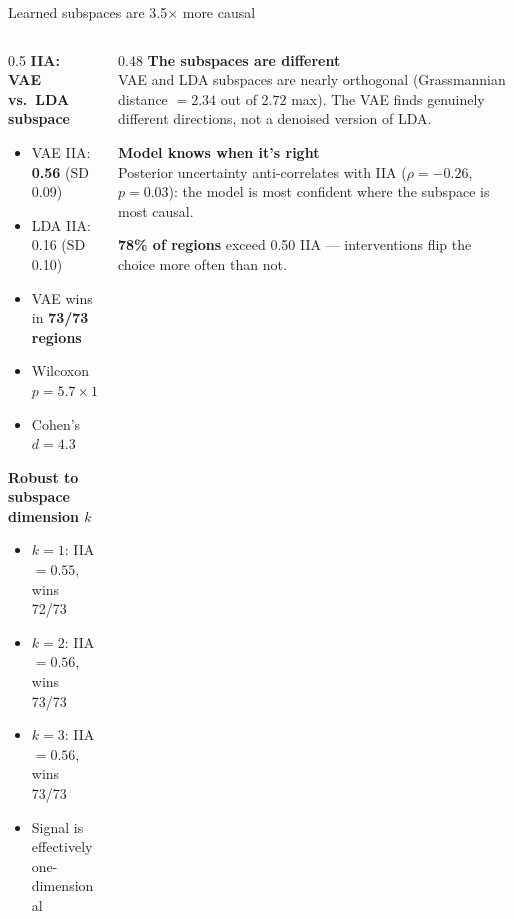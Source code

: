 \documentclass[aspectratio=169,11pt]{beamer}
\begin{document}
\begin{frame}{Learned subspaces are 3.5$\times$ more causal}
\begin{columns}[T]
\begin{column}{0.5\textwidth}
\textbf{IIA: VAE vs.\ LDA subspace}
\begin{itemize}\setlength\itemsep{1pt}
  \item VAE IIA: \textbf{0.56} (SD 0.09)
  \item LDA IIA: 0.16 (SD 0.10)
  \item VAE wins in \textbf{73/73 regions}
  \item Wilcoxon $p = 5.7 \times 10^{-14}$
  \item Cohen's $d = 4.3$
\end{itemize}

\vspace{0.3em}
\textbf{Robust to subspace dimension $k$}
\begin{itemize}\setlength\itemsep{1pt}
  \item $k{=}1$: IIA $= 0.55$, wins 72/73
  \item $k{=}2$: IIA $= 0.56$, wins 73/73
  \item $k{=}3$: IIA $= 0.56$, wins 73/73
  \item Signal is effectively one-dimensional
\end{itemize}
\end{column}
\begin{column}{0.48\textwidth}
\textbf{The subspaces are different}\\[0.3em]
{\small VAE and LDA subspaces are nearly orthogonal (Grassmannian distance $= 2.34$ out of $2.72$ max). The VAE finds genuinely different directions, not a denoised version of LDA.}

\vspace{0.5em}
\textbf{Model knows when it's right}\\[0.3em]
{\small Posterior uncertainty anti-correlates with IIA ($\rho = -0.26$, $p = 0.03$): the model is most confident where the subspace is most causal.}

\vspace{0.5em}
\textbf{78\% of regions} exceed 0.50 IIA --- interventions flip the choice more often than not.
\end{column}
\end{columns}
\end{frame}
\end{document}

